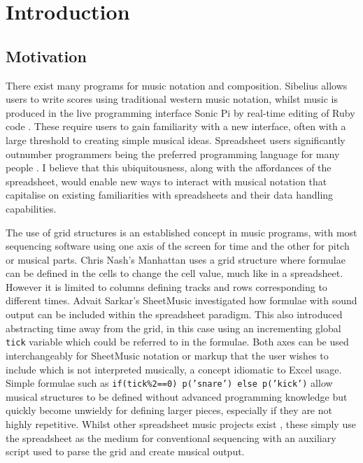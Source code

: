 \chapter{Introduction}

\section{Motivation}

There exist many programs for music notation and composition. Sibelius allows users to write scores using traditional western music notation, whilst music is produced in the live programming interface Sonic Pi by real-time editing of Ruby code \cite{aaron:pi}. These require users to gain familiarity with a new interface, often with a large threshold to creating simple musical ideas. Spreadsheet users significantly outnumber programmers \cite{scaffidi:estimating} being the preferred programming language for many people \cite{blackwell:functions}. I believe that this ubiquitousness, along with the affordances of the spreadsheet, would enable new ways to interact with musical notation that capitalise on existing familiarities with spreadsheets and their data handling capabilities.

The use of grid structures is an established concept in music programs, with most sequencing software using one axis of the screen for time and the other for pitch or musical parts. Chris Nash's Manhattan \cite{nash:manhattan} uses a grid structure where formulae can be defined in the cells to change the cell value, much like in a spreadsheet. However it is limited to columns defining tracks and rows corresponding to different times. Advait Sarkar's SheetMusic \cite{sarkar:sheetmusic} investigated how formulae with sound output can be included within the spreadsheet paradigm. This also introduced abstracting time away from the grid, in this case using an incrementing global \texttt{tick} variable which could be referred to in the formulae. Both axes can be used interchangeably for SheetMusic notation or markup that the user wishes to include which is not interpreted musically, a concept idiomatic to Excel usage. Simple formulae such as \texttt{if(tick\%2==0) p('snare') else p('kick')} allow musical structures to be defined without advanced programming knowledge but quickly become unwieldy for defining larger pieces, especially if they are not highly repetitive. Whilst other spreadsheet music projects exist \cite{hackaday:spreadsheet}, these simply use the spreadsheet as the medium for conventional sequencing with an auxiliary script used to parse the grid and create musical output.

